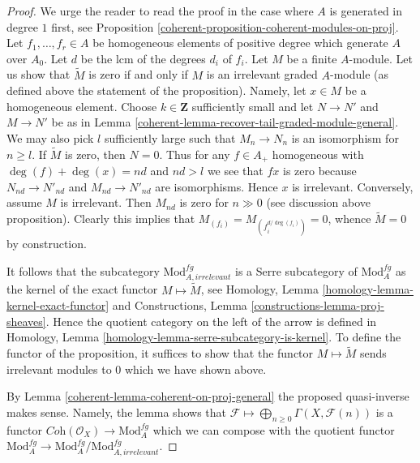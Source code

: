 \begin{proof}

We urge the reader to read the proof in the case where $A$
is generated in degree $1$ first, see
Proposition \ref{coherent-proposition-coherent-modules-on-proj}.
Let $f_1, \ldots, f_r \in A$ be homogeneous elements of positive degree
which generate $A$ over $A_0$. Let $d$ be the lcm of the degrees
$d_i$ of $f_i$. Let $M$ be a finite $A$-module.
Let us show that $\widetilde{M}$ is zero if and
only if $M$ is an irrelevant graded $A$-module (as defined above
the statement of the proposition). Namely, let $x \in M$ be a
homogeneous element.
Choose $k \in \mathbf{Z}$ sufficiently small and let
$N \to N'$ and $M \to N'$ be as in
Lemma \ref{coherent-lemma-recover-tail-graded-module-general}.
We may also pick $l$ sufficiently large such that
$M_n \to N_n$ is an isomorphism for $n \geq l$.
If $\widetilde{M}$ is zero, then $N = 0$.
Thus for any $f \in A_+$ homogeneous with
$\deg(f) + \deg(x) = nd$ and $nd > l$ we see that $fx$ is zero
because $N_{nd} \to N'_{nd}$ and $M_{nd} \to N'_{nd}$ are isomorphisms.
Hence $x$ is irrelevant.
Conversely, assume $M$ is irrelevant. Then $M_{nd}$ is zero
for $n \gg 0$ (see discussion above proposition).
Clearly this implies that $M_{(f_i)} = M_{(f_i^{d/\deg(f_i)})} = 0$,
whence $\widetilde{M} = 0$ by construction.

\medskip\noindent
It follows that the subcategory $\text{Mod}^{fg}_{A, irrelevant}$
is a Serre subcategory of $\text{Mod}^{fg}_A$ as the kernel
of the exact functor $M \mapsto \widetilde M$, see
Homology, Lemma \ref{homology-lemma-kernel-exact-functor}
and Constructions, Lemma \ref{constructions-lemma-proj-sheaves}.
Hence the quotient category on the left of the arrow is defined
in Homology, Lemma \ref{homology-lemma-serre-subcategory-is-kernel}.
To define the functor of the proposition, it suffices to show that
the functor $M \mapsto \widetilde M$ sends irrelevant modules to $0$
which we have shown above.

\medskip\noindent
By Lemma \ref{coherent-lemma-coherent-on-proj-general} the proposed quasi-inverse
makes sense. Namely, the lemma shows that
$\mathcal{F} \longmapsto \bigoplus_{n \geq 0} \Gamma(X, \mathcal{F}(n))$
is a functor $\textit{Coh}(\mathcal{O}_X) \to \text{Mod}^{fg}_A$
which we can compose with the quotient functor
$\text{Mod}^{fg}_A \to \text{Mod}^{fg}_A/\text{Mod}^{fg}_{A, irrelevant}$.


\end{proof}
